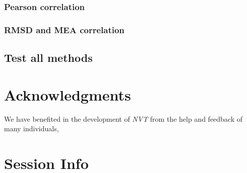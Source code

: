 \documentclass[11pt]{article}\usepackage[]{graphicx}\usepackage[]{color}
\newcommand{\nvt}{\textit{NVT}}
\begin{document}
\subsubsection{Pearson correlation}

\subsubsection{RMSD and MEA correlation}

\subsection{Test all methods}


\section{Acknowledgments}

We have benefited in the development of \nvt{} from the help and
feedback of many individuals,
\section{Session Info}


\end{document}
